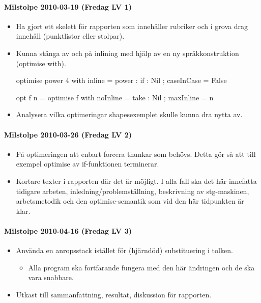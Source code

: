 \documentclass[../Appendix]{subfiles}
\begin{document}
\paragraph{Milstolpe 2010-03-19 (Fredag LV 1)}
\begin{itemize}
\item Ha gjort ett skelett för rapporten som innehåller rubriker och i grova
drag innehåll (punktlistor eller stolpar).
\item Kunna stänga av och på inlining med hjälp av en ny språkkonstruktion
(optimise with).


\begin{codeEx}
optimise power 4 with 
	{ inline     = power : if : Nil 
	; caseInCase = False
	}

opt f n = optimise f with 
	{ noInline  = take : Nil
	; maxInline = n
	}
\end{codeEx}

\item Analysera vilka optimeringar shapesexemplet skulle kunna dra nytta
av.
\end{itemize}

\paragraph{Milstolpe 2010-03-26 (Fredag LV 2)}
\begin{itemize}
\item Få optimeringen att enbart forcera thunkar som behövs. Detta gör så
att till exempel optimise av if-funktionen terminerar.
\item Kortare texter i rapporten där det är möjligt. I alla fall ska det
här innefatta tidigare arbeten, inledning/problemställning, beskrivning
av stg-maskinen, arbetsmetodik och den optimise-semantik som vid den
här tidpunkten är klar.
\end{itemize}

\paragraph{Milstolpe 2010-04-16 (Fredag LV 3)}
\begin{itemize}
\item Använda en anropsstack istället för (hjärndöd) substituering i tolken.

\begin{itemize}
\item Alla program ska fortfarande fungera med den här ändringen och de
ska vara snabbare.
\end{itemize}
\item Utkast till sammanfattning, resultat, diskussion för rapporten.
\end{itemize}
\end{document}
